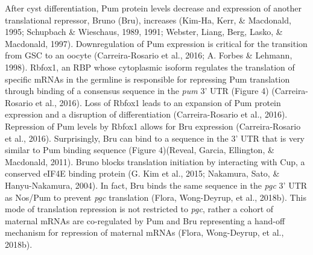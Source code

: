 \documentclass[12pt,oneside]{reedthesis}
\begin{document}
After cyst differentiation, Pum protein levels decrease and expression
of another translational repressor, Bruno (Bru), increases
(Kim-Ha, Kerr, \& Macdonald, 1995; Schupbach \& Wieschaus, 1989, 1991; Webster, Liang, Berg, Lasko, \& Macdonald, 1997). Downregulation of Pum expression is
critical for the transition from GSC to an oocyte
(Carreira-Rosario et al., 2016; A. Forbes \& Lehmann, 1998). Rbfox1, an RBP whose
cytoplasmic isoform regulates the translation of specific mRNAs in the
germline is responsible for repressing Pum translation through binding
of a consensus sequence in the \emph{pum} 3' UTR (Figure 4)
(Carreira-Rosario et al., 2016). Loss of Rbfox1 leads to an expansion of Pum
protein expression and a disruption of differentiation
(Carreira-Rosario et al., 2016). Repression of Pum levels by Rbfox1 allows
for Bru expression (Carreira-Rosario et al., 2016). Surprisingly, Bru can
bind to a sequence in the 3' UTR that is very similar to Pum binding
sequence (Figure 4)(Reveal, Garcia, Ellington, \& Macdonald, 2011). Bruno blocks translation
initiation by interacting with Cup, a conserved eIF4E binding protein
(G. Kim et al., 2015; Nakamura, Sato, \& Hanyu-Nakamura, 2004). In fact, Bru binds the same sequence in
the \emph{pgc} 3' UTR as Nos/Pum to prevent \emph{pgc} translation
(Flora, Wong-Deyrup, et al., 2018b). This mode of translation repression is not restricted
to \emph{pgc}, rather a cohort of maternal mRNAs are co-regulated by Pum and
Bru representing a hand-off mechanism for repression of maternal mRNAs
(Flora, Wong-Deyrup, et al., 2018b).
\end{document}
